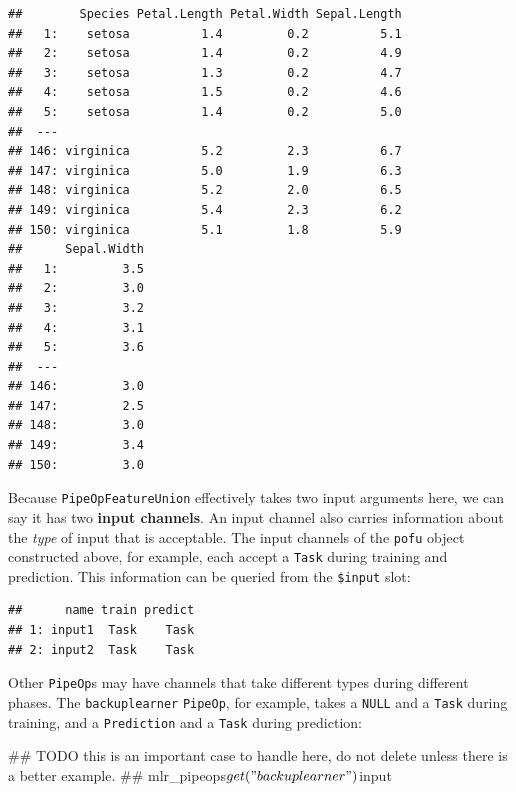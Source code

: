 \documentclass[]{article}
\newenvironment{Shaded}{\begin{snugshade}}{\end{snugshade}}
\newcommand{\AlertTok}[1]{\textcolor[rgb]{0.94,0.16,0.16}{#1}}
\newcommand{\NormalTok}[1]{#1}
\newcommand{\OperatorTok}[1]{\textcolor[rgb]{0.81,0.36,0.00}{\textbf{#1}}}
\renewenvironment{Shaded} {\begin{snugshade}\small} {\end{snugshade}}
\begin{document}
\begin{verbatim}
##        Species Petal.Length Petal.Width Sepal.Length
##   1:    setosa          1.4         0.2          5.1
##   2:    setosa          1.4         0.2          4.9
##   3:    setosa          1.3         0.2          4.7
##   4:    setosa          1.5         0.2          4.6
##   5:    setosa          1.4         0.2          5.0
##  ---                                                
## 146: virginica          5.2         2.3          6.7
## 147: virginica          5.0         1.9          6.3
## 148: virginica          5.2         2.0          6.5
## 149: virginica          5.4         2.3          6.2
## 150: virginica          5.1         1.8          5.9
##      Sepal.Width
##   1:         3.5
##   2:         3.0
##   3:         3.2
##   4:         3.1
##   5:         3.6
##  ---            
## 146:         3.0
## 147:         2.5
## 148:         3.0
## 149:         3.4
## 150:         3.0
\end{verbatim}

Because \texttt{PipeOpFeatureUnion} effectively takes two input arguments here, we can say it has two \textbf{input channels}.
An input channel also carries information about the \emph{type} of input that is acceptable.
The input channels of the \texttt{pofu} object constructed above, for example, each accept a \texttt{Task} during training and prediction.
This information can be queried from the \texttt{\$input} slot:

\begin{Shaded}
\end{Shaded}

\begin{verbatim}
##      name train predict
## 1: input1  Task    Task
## 2: input2  Task    Task
\end{verbatim}

Other \texttt{PipeOp}s may have channels that take different types during different phases.
The \texttt{backuplearner} \texttt{PipeOp}, for example, takes a \texttt{NULL} and a \texttt{Task} during training, and a \texttt{Prediction} and a \texttt{Task} during prediction:

\begin{Shaded}
\begin{Highlighting}[]
\NormalTok{## }\AlertTok{TODO}\NormalTok{ this is an important case to handle here, do not delete unless there is a better example.}
\NormalTok{## mlr_pipeops$get("backuplearner")$input}
\end{Highlighting}
\end{Shaded}
\end{document}
